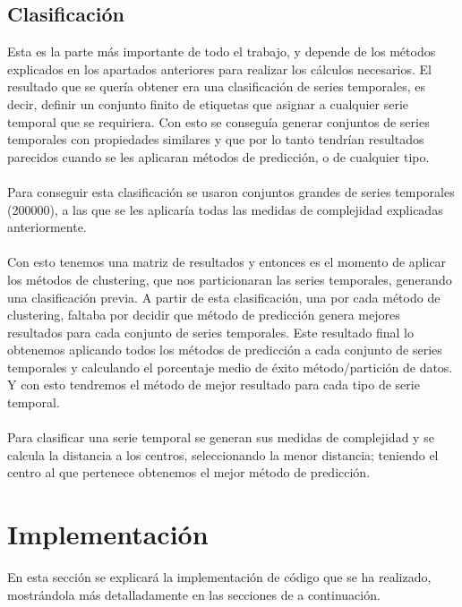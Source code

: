 \documentclass[14pt]{extarticle}
\theoremstyle{definition}
\theoremstyle{remark}
\begin{document}
\subsection{Clasificación}\label{sec:Clasificacion}
Esta es la parte más importante de todo el trabajo, y depende de los métodos explicados en los apartados anteriores para realizar los cálculos necesarios. El resultado que se quería obtener era una clasificación de series temporales, es decir, definir un conjunto finito de etiquetas que asignar a cualquier serie temporal que se requiriera. Con esto se conseguía generar conjuntos de series temporales con propiedades similares y que por lo tanto tendrían resultados parecidos cuando se les aplicaran métodos de predicción, o de cualquier tipo.\\\\Para conseguir esta clasificación se usaron conjuntos grandes de series temporales (200000), a las que se les aplicaría todas las medidas de complejidad explicadas anteriormente.\\\\Con esto tenemos una matriz de resultados y entonces es el momento de aplicar los métodos de clustering, que nos particionaran las series temporales, generando una clasificación previa. A partir de esta clasificación, una por cada método de clustering, faltaba por decidir que método de predicción genera mejores resultados para cada conjunto de series temporales. Este resultado final lo obtenemos aplicando todos los métodos de predicción a cada conjunto de series temporales y calculando el porcentaje medio de éxito método/partición de datos. Y con esto tendremos el método de mejor resultado para cada tipo de serie temporal.\\\\Para clasificar una serie temporal se generan sus medidas de complejidad y se calcula la distancia a los centros, seleccionando la menor distancia; teniendo el centro al que pertenece obtenemos el mejor método de predicción.

\newpage
\section{Implementación}\label{sec:implementacion}
En esta sección se explicará la implementación de código que se ha realizado, mostrándola más detalladamente en las secciones de a continuación.
\end{document}
